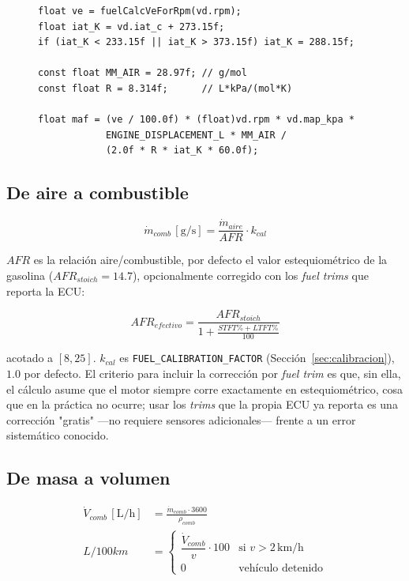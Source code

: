 \begin{figure}[H]
\begin{lstlisting}[caption={Núcleo del cálculo speed-density, \texttt{src/fuel\_calc.cpp}.}, label={fig:fuelcalc}]
float ve = fuelCalcVeForRpm(vd.rpm);
float iat_K = vd.iat_c + 273.15f;
if (iat_K < 233.15f || iat_K > 373.15f) iat_K = 288.15f;

const float MM_AIR = 28.97f; // g/mol
const float R = 8.314f;      // L*kPa/(mol*K)

float maf = (ve / 100.0f) * (float)vd.rpm * vd.map_kpa *
            ENGINE_DISPLACEMENT_L * MM_AIR /
            (2.0f * R * iat_K * 60.0f);
\end{lstlisting}
\end{figure}

\subsection{De aire a combustible}

\begin{equation}
\dot{m}_{comb}\,[\text{g/s}] = \frac{\dot{m}_{aire}}{AFR} \cdot k_{cal}
\end{equation}

$AFR$ es la relación aire/combustible, por defecto el valor estequiométrico
de la gasolina ($AFR_{stoich} = 14.7$), opcionalmente corregido con los
\textit{fuel trims} que reporta la ECU:

\begin{equation}
AFR_{efectivo} = \frac{AFR_{stoich}}{1 + \frac{STFT\% + LTFT\%}{100}}
\end{equation}

acotado a $[8, 25]$. $k_{cal}$ es \texttt{FUEL\_CALIBRATION\_FACTOR}
(Sección~\ref{sec:calibracion}), $1.0$ por defecto. El criterio para incluir
la corrección por \textit{fuel trim} es que, sin ella, el cálculo asume que
el motor siempre corre exactamente en estequiométrico, cosa que en la
práctica no ocurre; usar los \textit{trims} que la propia ECU ya reporta es
una corrección "gratis" —no requiere sensores adicionales— frente a un error
sistemático conocido.

\subsection{De masa a volumen}

\begin{align}
\dot{V}_{comb}\,[\text{L/h}] &= \frac{\dot{m}_{comb} \cdot 3600}{\rho_{comb}} \\[4pt]
L/100km &=
  \begin{cases}
    \dfrac{\dot{V}_{comb}}{v}\cdot 100 & \text{si } v > 2\,\text{km/h} \\[6pt]
    0 & \text{vehículo detenido}
  \end{cases}
\end{align}

